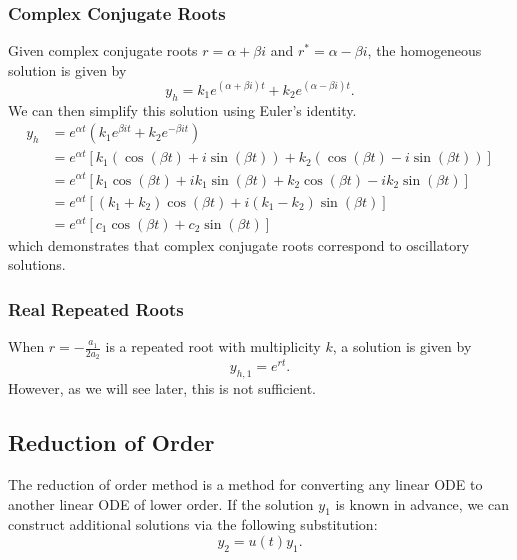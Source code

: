 \documentclass{article}
\begin{document}
\subsubsection{Complex Conjugate Roots}
Given complex conjugate roots \(r = \alpha + \beta i\) and \(r^\ast = \alpha - \beta i\),
the homogeneous solution is given by
\begin{equation*}
    y_h = k_1 e^{\left( \alpha + \beta i \right) t} + k_2 e^{\left( \alpha - \beta i \right) t}.
\end{equation*}
We can then simplify this solution using Euler's identity.
\begin{align*}
    y_h & = e^{\alpha t} \left( k_1 e^{\beta i t} + k_2 e^{-\beta i t} \right)                                                                                                                            \\
        & = e^{\alpha t} \left[ k_1 \left( \cos{\left( \beta t \right)} + i\sin{\left( \beta t \right)} \right) + k_2 \left( \cos{\left( \beta t \right)} - i\sin{\left( \beta t \right)} \right) \right] \\
        & = e^{\alpha t} \left[ k_1 \cos{\left( \beta t \right)} + i k_1 \sin{\left( \beta t \right)} + k_2 \cos{\left( \beta t \right)} - i k_2 \sin{\left( \beta t \right)} \right]                     \\
        & = e^{\alpha t} \left[ \left( k_1 + k_2 \right) \cos{\left( \beta t \right)} + i \left( k_1 - k_2 \right) \sin{\left( \beta t \right)} \right]                                                   \\
        & = e^{\alpha t} \left[ c_1 \cos{\left( \beta t \right)} + c_2 \sin{\left( \beta t \right)} \right]
\end{align*}
which demonstrates that complex conjugate roots correspond to oscillatory solutions.
\subsubsection{Real Repeated Roots}
When \(r = -\frac{a_1}{2a_2}\) is a repeated root with multiplicity \(k\), a solution is given by
\begin{equation*}
    y_{h,1} = e^{rt}.
\end{equation*}
However, as we will see later, this is not sufficient.
\subsection{Reduction of Order}
The reduction of order method is a method for converting any linear ODE to another linear ODE of lower order.
If the solution \(y_1\) is known in advance, we can construct additional solutions via the following substitution:
\begin{equation*}
    y_2 = u\left( t \right) y_1.
\end{equation*}
\end{document}
